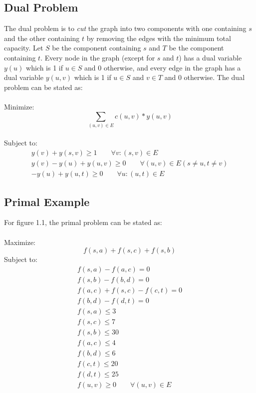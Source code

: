 \documentclass[twoside]{article}
\begin{document}
\subsection{Dual Problem}
The dual problem is to {\em cut} the graph into two components with one containing $s$ and the other containing $t$ by removing the edges with the minimum total capacity. Let $S$ be the component containing $s$ and $T$ be the component containing $t$. Every node in the graph (except for $s$ and $t$) has a dual variable $y(u)$ which is 1 if $u \in S$ and 0 otherwise, and every edge in the graph has a dual variable $y(u,v)$ which is 1 if $u \in S$ and $v \in T$ and 0 otherwise.  The dual problem can be stated as:\\\\
Minimize:
$$\sum_{(u,v) \in E}c(u,v)*y(u,v)$$\\
Subject to: \\
$$
\begin{gathered}
y(v) + y(s,v) \geq 1\qquad \forall v: (s,v) \in E\\
y(v) - y(u) + y(u,v) \geq 0\qquad \forall(u,v) \in E (s \neq u, t \neq v)\\
-y(u) + y(u,t) \geq 0\qquad \forall u: (u,t) \in E
\end{gathered}
$$
\newpage
\subsection{Primal Example}
For figure 1.1, the primal problem can be stated as:\\\\
Maximize:
$$f(s,a) + f(s,c) + f(s,b)$$
Subject to:\\
$$
\begin{gathered}
f(s,a) - f(a,c) = 0\\
f(s,b) - f(b,d) = 0\\
f(a,c) + f(s,c) - f(c,t) = 0\\
f(b,d) - f(d,t) = 0\\
f(s,a) \leq3\\
f(s,c) \leq7\\
f(s,b) \leq30\\
f(a,c) \leq4\\
f(b,d) \leq6\\
f(c,t) \leq20\\
f(d,t) \leq25\\
f(u,v) \geq 0\qquad \forall(u,v) \in E
\end{gathered}
$$
\end{document}
